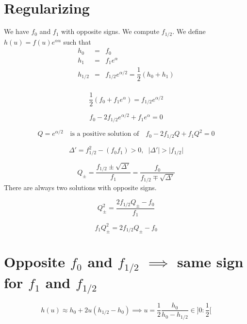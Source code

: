 \documentclass[aps,11pt]{revtex4}
\begin{document}
\section{Regularizing}
We have $f_0$ and $f_1$ with opposite signs.
We compute $f_{1/2}$.
We define $h(u) = f(u) e^{\alpha u}$ such that
\begin{equation}
\begin{array}{lcl}
h_0  & = & f_0  \\
h_1  & = & f_1 e^{\alpha} \\
h_{1/2} & = & f_{1/2} e^{\alpha/2} = \dfrac{1}{2}( h_0+h_1 )\\
\end{array}
\end{equation}
 
\begin{equation}
	\dfrac{1}{2}( f_0+f_1 e^\alpha ) = f_{1/2} e^{\alpha/2} 
\end{equation} 

\begin{equation}
	f_0 - 2 f_{1/2} e^{\alpha/2}  + f_1 e^\alpha = 0
\end{equation} 

$$
	 Q = e^{\alpha/2} \text{~~~is a positive solution of~~~} f_0 - 2 f_{1/2} Q  + f_1 Q^2 = 0
$$

\begin{equation}
	\Delta' = f_{1/2}^2 - (f_0f_1) > 0, \;\; \vert \Delta' \vert > \vert f_{1/2} \vert
\end{equation}

\begin{equation}
	Q_\pm = \dfrac{ f_{1/2} \pm \sqrt{\Delta'} }{f_1} = \dfrac{f_0}{f_{1/2} \mp \sqrt{\Delta'}}
\end{equation}
There are always two solutions with opposite signs.
 
\begin{equation}
	Q_\pm^2 = \dfrac{2f_{1/2}Q_\pm - f_0}{f_1}
\end{equation}
 
\begin{equation}
	f_1 Q_\pm^2 =  2f_{1/2}Q_\pm - f_0
\end{equation}

 
\section{Opposite $f_0$ and $f_{1/2}$ $\implies$ same sign for $f_1$ and $f_{1/2}$}
 
 $$
 	h(u) \approx h_0 + 2 u (h_{1/2}-h_0) \implies u = \dfrac{1}{2} \dfrac{h_0}{h_0-h_{1/2}} \in ]0:\frac{1}{2}[
 $$
  
\end{document}
